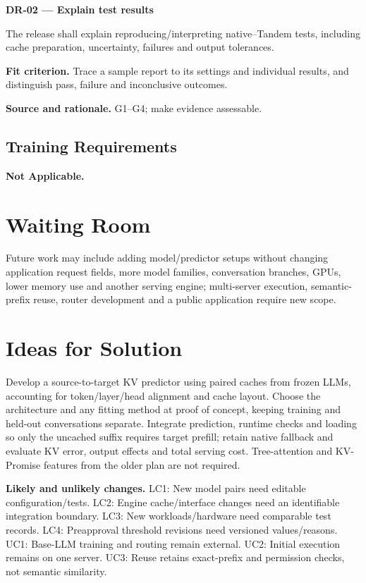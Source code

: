 \documentclass[12pt]{article}
\begin{document}
\par\medskip\noindent{}\label{req:DR-02}
\textbf{DR-02 --- Explain test results}\par
The release shall explain reproducing/interpreting native--Tandem tests, including cache preparation, uncertainty, failures and output tolerances.\par
\textbf{Fit criterion.} Trace a sample report to its settings and individual results, and distinguish pass, failure and inconclusive outcomes.\par
\textbf{Source and rationale.} G1--G4; make evidence assessable.


\subsection{Training Requirements}
\textbf{Not Applicable.}


\section{Waiting Room}
Future work may include adding model/predictor setups without changing application request fields, more model families, conversation branches, GPUs, lower memory use and another serving engine; multi-server execution, semantic-prefix reuse, router development and a public application require new scope.


\section{Ideas for Solution}
Develop a source-to-target KV predictor using paired caches from frozen
LLMs, accounting for token/layer/head alignment and cache layout. Choose the
architecture and any fitting method at proof of concept, keeping training
and held-out conversations separate. Integrate prediction, runtime checks
and loading so only the uncached suffix requires target prefill; retain
native fallback and evaluate KV error, output effects and total serving cost.
Tree-attention and KV-Promise features from the older plan are not required.


\par\medskip\noindent\textbf{Likely and unlikely changes.}
LC1: New model pairs need editable configuration/tests.
LC2: Engine cache/interface changes need an identifiable integration boundary.
LC3: New workloads/hardware need comparable test records.
LC4: Preapproval threshold revisions need versioned values/reasons.
UC1: Base-LLM training and routing remain external.
UC2: Initial execution remains on one server.
UC3: Reuse retains exact-prefix and permission checks, not semantic similarity.
\end{document}
